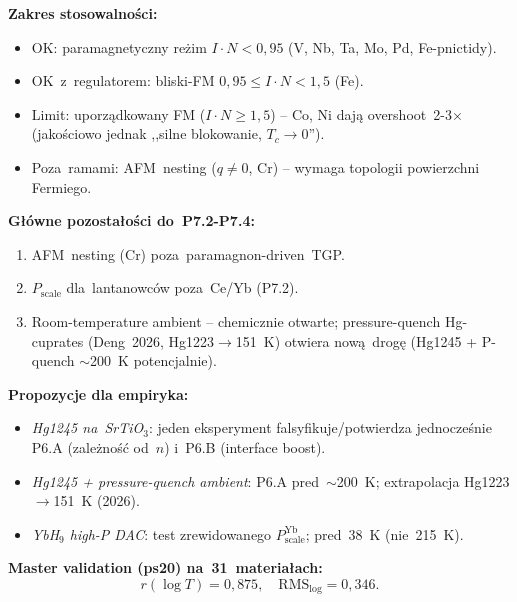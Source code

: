 \medskip\noindent\textbf{Zakres stosowalno\'sci:}
\begin{itemize}\itemsep0pt
  \item OK: paramagnetyczny re\.zim $I\cdot N\!<\!0{,}95$ (V, Nb, Ta, Mo, Pd, Fe-pnictidy).
  \item OK~z~regulatorem: bliski-FM $0{,}95\!\le\!I\cdot N\!<\!1{,}5$ (Fe).
  \item Limit: uporz\k{a}dkowany FM ($I\cdot N\!\ge\!1{,}5$) -- Co, Ni daj\k{a} overshoot~2-3$\times$ (jako\'sciowo jednak ,,silne blokowanie, $T_c\to0$'').
  \item Poza~ramami: AFM~nesting ($q\!\ne\!0$, Cr) -- wymaga topologii powierzchni Fermiego.
\end{itemize}

\medskip\noindent\textbf{G\l{}\'owne pozosta\l{}o\'sci do~P7.2-P7.4:}
\begin{enumerate}\itemsep0pt
  \item AFM~nesting (Cr) poza~paramagnon-driven~TGP.
  \item $P_\text{scale}$ dla~lantanowc\'ow poza~Ce/Yb (P7.2).
  \item Room-temperature ambient -- chemicznie otwarte; pressure-quench
    Hg-cuprates (Deng~2026, Hg1223$\to$151~K) otwiera now\k{a}~drog\k{e}
    (Hg1245 + P-quench $\sim$200~K potencjalnie).
\end{enumerate}

\medskip\noindent\textbf{Propozycje dla empiryka:}
\begin{itemize}\itemsep0pt
  \item \emph{Hg1245 na~SrTiO$_3$}: jeden eksperyment falsyfikuje/potwierdza
    jednocze\'snie P6.A (zale\.zno\'s\'c od~$n$) i~P6.B (interface boost).
  \item \emph{Hg1245 + pressure-quench ambient}: P6.A pred~$\sim$200~K;
    extrapolacja Hg1223$\to$151~K (2026).
  \item \emph{YbH$_9$ high-P DAC}: test zrewidowanego $P_\text{scale}^\text{Yb}$; pred~38~K (nie~215~K).
\end{itemize}

\medskip\noindent\textbf{Master validation (ps20) na~31~materia\l{}ach:}
\[r(\log T)=0{,}875,\quad \text{RMS}_\text{log}=0{,}346.\]

